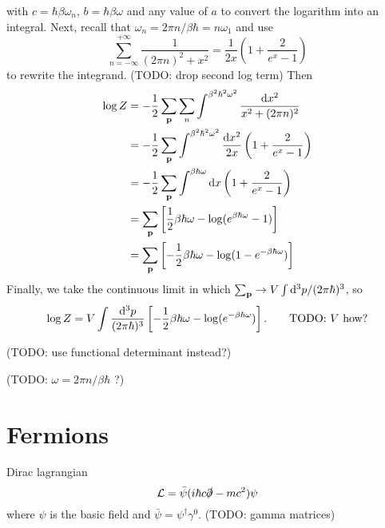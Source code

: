 with $c = \hbar \beta \omega_n$, $b = \hbar \beta \omega$ and any value of $a$ to convert the logarithm into an integral.
Next, recall that $\omega_n = 2 \pi n / \beta \hbar = n \omega_1$ and use
\begin{equation}
	\sum_{n=-\infty}^{+\infty} \frac{1}{(2 \pi n)^2 + x^2} = \frac{1}{2 x} \left( 1 + \frac{2}{e^x - 1} \right)
\end{equation}
to rewrite the integrand.
(TODO: drop second log term)
Then
\begin{equation}
\begin{split}
	\log Z & = -\frac12 \sum_{\mathbf{p}} \sum_n \int^{\beta^2 \hbar^2 \omega^2} \frac{\mathop{}\!\mathrm{d} x^2}{x^2 + (2 \pi n)^2} \\
	       & = -\frac12 \sum_{\mathbf{p}}        \int^{\beta^2 \hbar^2 \omega^2} \frac{\mathop{}\!\mathrm{d} x^2}{2 x} \left( 1 + \frac{2}{e^x - 1} \right) \\
	       & = -\frac12 \sum_{\mathbf{p}}        \int^{\beta   \hbar   \omega  }       \mathop{}\!\mathrm{d} x         \left( 1 + \frac{2}{e^x - 1} \right) \\
	       & =          \sum_{\mathbf{p}}        \left[  \frac12 \beta \hbar \omega - \log(e^{\beta \hbar \omega} - 1) \right] \\
	       & =          \sum_{\mathbf{p}}        \left[ -\frac12 \beta \hbar \omega - \log(1 - e^{-\beta \hbar \omega}) \right] \\
\end{split}
\end{equation}
Finally, we take the continuous limit in which $\sum_{\mathbf{p}} \rightarrow V \int \mathop{}\!\mathrm{d}^3 p / (2 \pi \hbar)^3$, so
\begin{equation}
	\log Z = V \int \frac{\mathop{}\!\mathrm{d}^3 p}{(2 \pi \hbar)^3} \left[ -\frac12 \beta \hbar \omega - \log(e^{-\beta \hbar \omega}) \right] .
	\qquad \text{TODO: $V$ how?}
\end{equation}

(TODO: use functional determinant instead?)

(TODO: $\omega = 2 \pi n / \beta \hbar$ ?)

\section{Fermions}

Dirac lagrangian
\begin{equation}
	\mathcal{L} = \bar\psi (i \hbar c \slashed\partial - m c^2) \psi
\end{equation}
where $\psi$ is the basic field and $\bar\psi = \psi^\dagger \gamma^0$.
(TODO: gamma matrices)

